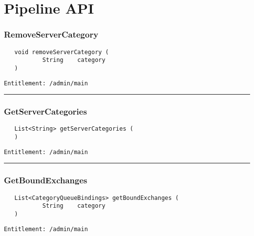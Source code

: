 \chapter{Pipeline API}

\subsection{RemoveServerCategory}
\label{Api:RemoveServerCategory}
\begin{verbatim}
   void removeServerCategory (
           String    category
   )
\end{verbatim}
\begin{Verbatim}[fontsize=\small, formatcom=\color{Maroon}]
  Entitlement: /admin/main
\end{Verbatim}



\rule{12cm}{2pt}
\subsection{GetServerCategories}
\label{Api:GetServerCategories}
\begin{verbatim}
   List<String> getServerCategories (
   )
\end{verbatim}
\begin{Verbatim}[fontsize=\small, formatcom=\color{Maroon}]
  Entitlement: /admin/main
\end{Verbatim}



\rule{12cm}{2pt}
\subsection{GetBoundExchanges}
\label{Api:GetBoundExchanges}
\begin{verbatim}
   List<CategoryQueueBindings> getBoundExchanges (
           String    category
   )
\end{verbatim}
\begin{Verbatim}[fontsize=\small, formatcom=\color{Maroon}]
  Entitlement: /admin/main
\end{Verbatim}



